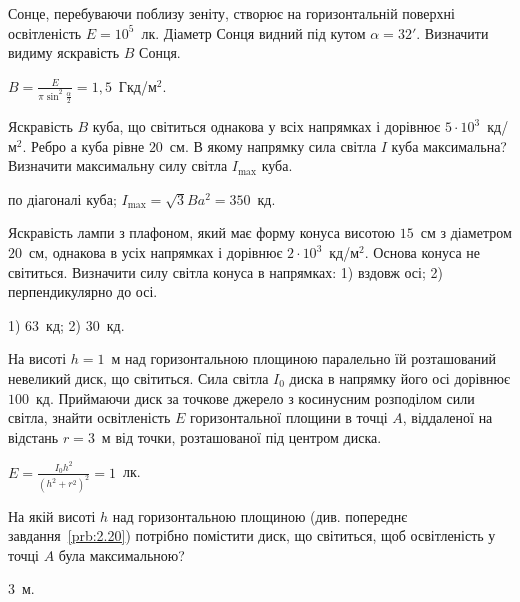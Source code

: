 \begin{problem}%
Сонце, перебуваючи поблизу зеніту, створює на горизонтальній
поверхні освітленість $E = 10^5$~лк. Діаметр Сонця видний під кутом $\alpha =
	32'$. Визначити видиму яскравість $B$ Сонця.
\begin{solution}
	$B = \frac{E}{\pi\sin^2\frac{\alpha}{2}} = 1,5$~Гкд/м$^2$.
\end{solution}
\end{problem}


\begin{problem}%
Яскравість $B$ куба, що світиться однакова у всіх напрямках і дорівнює
$5\cdot10^3$~кд/м$^2$. Ребро а куба рівне $20$~см. В якому напрямку сила світла $I$
куба максимальна? Визначити максимальну силу світла $I_{\max}$ куба.
\begin{solution}
	по діагоналі куба; $I_{\max} = \sqrt3 Ba^2 = 350$~кд.
\end{solution}
\end{problem}


\begin{problem}%
Яскравість лампи з плафоном, який має форму конуса висотою $15$~см з
діаметром $20$~см, однакова в усіх напрямках і дорівнює $2 \cdot 10^3$~кд/м$^2$.
Основа конуса не світиться. Визначити силу світла конуса в напрямках:
1) вздовж осі; 2) перпендикулярно до осі.
\begin{solution}
	1) $63$~кд; 2) $30$~кд.
\end{solution}
\end{problem}


\begin{problem}\label{prb:2.20}%
На висоті $h = 1$~м над горизонтальною площиною паралельно їй
розташований невеликий диск, що світиться. Сила світла $I_0$ диска в
напрямку його осі дорівнює $100$~кд. Приймаючи диск за точкове
джерело з косинусним розподілом сили світла, знайти освітленість $E$
горизонтальної площини в точці $A$, віддаленої на відстань $r = 3$~м від
точки, розташованої під центром диска.
\begin{solution}
	$E = \frac{I_0h^2}{(h^2 + r^2)^2} = 1$~лк.
\end{solution}
\end{problem}


\begin{problem}%
На якій висоті $h$ над горизонтальною площиною (див. попереднє
завдання~\ref{prb:2.20}) потрібно помістити диск, що світиться, щоб освітленість у
точці $A$ була максимальною?
\begin{solution}
	$3$~м.
\end{solution}
\end{problem}


